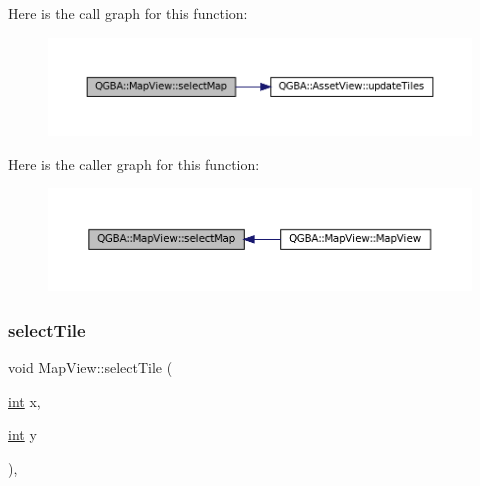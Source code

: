 Here is the call graph for this function\+:
\nopagebreak
\begin{figure}[H]
\begin{center}
\leavevmode
\includegraphics[width=350pt]{class_q_g_b_a_1_1_map_view_ad51a1de9d54f8ef9203ac28706cf3727_cgraph}
\end{center}
\end{figure}
Here is the caller graph for this function\+:
\nopagebreak
\begin{figure}[H]
\begin{center}
\leavevmode
\includegraphics[width=350pt]{class_q_g_b_a_1_1_map_view_ad51a1de9d54f8ef9203ac28706cf3727_icgraph}
\end{center}
\end{figure}
\mbox{\label{class_q_g_b_a_1_1_map_view_a562f195c2a34eb5f07be9f0d865e7d06}} 
\subsubsection{\texorpdfstring{select\+Tile}{selectTile}}
{\footnotesize\ttfamily void Map\+View\+::select\+Tile (\begin{DoxyParamCaption}\item[{\mbox{\hyperlink{ioapi_8h_a787fa3cf048117ba7123753c1e74fcd6}{int}}}]{x,  }\item[{\mbox{\hyperlink{ioapi_8h_a787fa3cf048117ba7123753c1e74fcd6}{int}}}]{y }\end{DoxyParamCaption})\hspace{0.3cm}{\ttfamily [private]}, {\ttfamily [slot]}}

